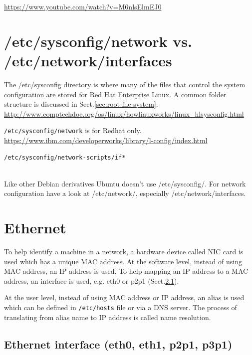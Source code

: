 \url{https://www.youtube.com/watch?v=M6nlsElmEJ0}

\section{/etc/sysconfig/network vs. /etc/network/interfaces}
\label{sec:etc-sysconfig-network}

The /etc/sysconfig directory is where many of the files that control the system
configuration are stored for Red Hat Enterprise Linux. A common folder structure
is discussed in Sect.\ref{sec:root-file-system}.
\url{http://www.comptechdoc.org/os/linux/howlinuxworks/linux_hlsysconfig.html}

\verb!/etc/sysconfig/network! is for Redhat only.
\url{https://www.ibm.com/developerworks/library/l-config/index.html}
\begin{verbatim}
/etc/sysconfig/network-scripts/if*
 
\end{verbatim}

Like other Debian derivatives Ubuntu doesn't use /etc/sysconfig/. For network
configuration have a look at /etc/network/, especially /etc/network/interfaces.



\section{Ethernet}
\label{sec:Ethernet}

To help identify a machine in a network, a hardware device called NIC card is
used which has a unique MAC address. At the software level, instead of using MAC
address, an IP address is used. To help mapping an IP address to a MAC address,
an interface is used, e.g. eth0 or p2p1 (Sect.\ref{sec:Ethernet_interface}). 

At the user level, instead of using MAC address or IP address, an alias is used
which can be defined in \verb!/etc/hosts! file or via a DNS server. The process
of translating from alias name to IP address is called name resolution. 

\subsection{Ethernet interface (eth0, eth1, p2p1, p3p1)}
\label{sec:Ethernet_interface}

